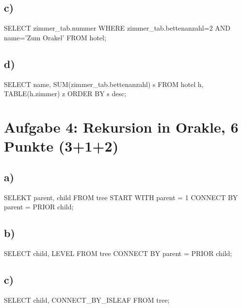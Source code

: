 \documentclass[12pt]{scrreprt}
\begin{document}
\subsection*{c)}
SELECT zimmer\_tab.nummer \newline
\hspace*{5mm}WHERE zimmer\_tab.bettenanzahl=2\newline
\hspace*{5mm}AND name='Zum Orakel'\newline
\hspace*{5mm}FROM hotel;\newline
\subsection*{d)}
SELECT name, SUM(zimmer\_tab.bettenanzahl) s FROM hotel h,\newline
\hspace*{5mm}TABLE(h.zimmer) z ORDER BY s desc;
\section*{Aufgabe 4: Rekursion in Orakle, 6 Punkte (3+1+2)}
\subsection*{a)}
SELEKT parent, child FROM tree\newline
\hspace*{5mm}START WITH parent = 1\newline
\hspace*{5mm}CONNECT BY parent = PRIOR child;\newline
\subsection*{b)}
SELECT child, LEVEL FROM tree\newline
\hspace*{5mm}CONNECT BY parent = PRIOR child;\newline
\subsection*{c)}
SELECT child, CONNECT\_BY\_ISLEAF\newline
\hspace*{5mm}FROM tree;
\end{document}
